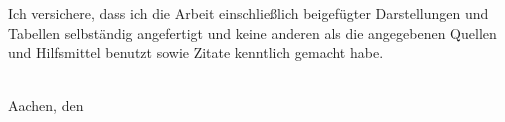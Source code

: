 
Ich versichere, dass ich die Arbeit einschließlich beigefügter Darstellungen und Tabellen selbständig angefertigt und keine anderen als die angegebenen Quellen und Hilfsmittel benutzt sowie Zitate kenntlich gemacht habe. 

\vspace{3cm}

\theauthor \\
Aachen, den \thedate